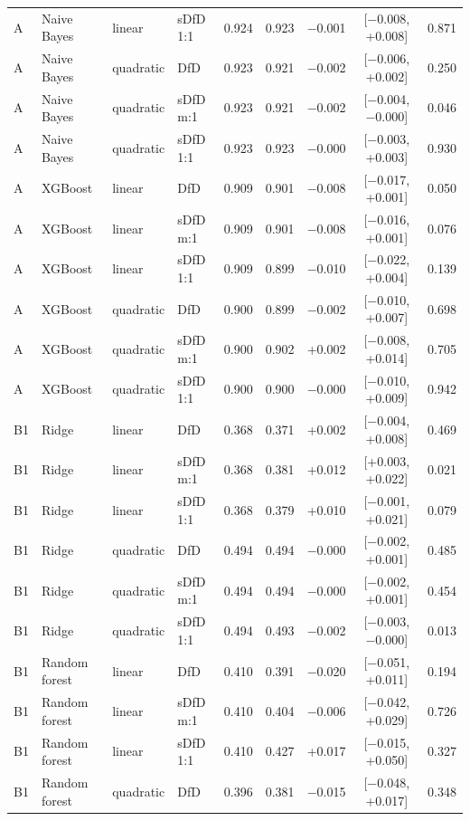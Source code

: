 \begin{longtable}{llllccccc}
A & Naive Bayes & linear & sDfD 1:1 & 0.924 & 0.923 & $-$0.001 & [$-$0.008, +0.008] & 0.871 \\
A & Naive Bayes & quadratic & DfD & 0.923 & 0.921 & $-$0.002 & [$-$0.006, +0.002] & 0.250 \\
A & Naive Bayes & quadratic & sDfD m:1 & 0.923 & 0.921 & $-$0.002 & [$-$0.004, $-$0.000] & 0.046 \\
A & Naive Bayes & quadratic & sDfD 1:1 & 0.923 & 0.923 & $-$0.000 & [$-$0.003, +0.003] & 0.930 \\
A & XGBoost & linear & DfD & 0.909 & 0.901 & $-$0.008 & [$-$0.017, +0.001] & 0.050 \\
A & XGBoost & linear & sDfD m:1 & 0.909 & 0.901 & $-$0.008 & [$-$0.016, +0.001] & 0.076 \\
A & XGBoost & linear & sDfD 1:1 & 0.909 & 0.899 & $-$0.010 & [$-$0.022, +0.004] & 0.139 \\
A & XGBoost & quadratic & DfD & 0.900 & 0.899 & $-$0.002 & [$-$0.010, +0.007] & 0.698 \\
A & XGBoost & quadratic & sDfD m:1 & 0.900 & 0.902 & +0.002 & [$-$0.008, +0.014] & 0.705 \\
A & XGBoost & quadratic & sDfD 1:1 & 0.900 & 0.900 & $-$0.000 & [$-$0.010, +0.009] & 0.942 \\
B1 & Ridge & linear & DfD & 0.368 & 0.371 & +0.002 & [$-$0.004, +0.008] & 0.469 \\
B1 & Ridge & linear & sDfD m:1 & 0.368 & 0.381 & +0.012 & [+0.003, +0.022] & 0.021 \\
B1 & Ridge & linear & sDfD 1:1 & 0.368 & 0.379 & +0.010 & [$-$0.001, +0.021] & 0.079 \\
B1 & Ridge & quadratic & DfD & 0.494 & 0.494 & $-$0.000 & [$-$0.002, +0.001] & 0.485 \\
B1 & Ridge & quadratic & sDfD m:1 & 0.494 & 0.494 & $-$0.000 & [$-$0.002, +0.001] & 0.454 \\
B1 & Ridge & quadratic & sDfD 1:1 & 0.494 & 0.493 & $-$0.002 & [$-$0.003, $-$0.000] & 0.013 \\
B1 & Random forest & linear & DfD & 0.410 & 0.391 & $-$0.020 & [$-$0.051, +0.011] & 0.194 \\
B1 & Random forest & linear & sDfD m:1 & 0.410 & 0.404 & $-$0.006 & [$-$0.042, +0.029] & 0.726 \\
B1 & Random forest & linear & sDfD 1:1 & 0.410 & 0.427 & +0.017 & [$-$0.015, +0.050] & 0.327 \\
B1 & Random forest & quadratic & DfD & 0.396 & 0.381 & $-$0.015 & [$-$0.048, +0.017] & 0.348 \\

\end{longtable}
